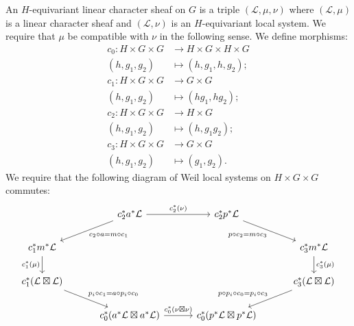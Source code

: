 \documentclass[10pt]{amsart}
\theoremstyle{plain}
\theoremstyle{definition}
\newcommand{\cs}[1]{{\mathcal{#1}}}
\begin{document}
An $H$-equivariant linear character sheaf on $G$ is a triple $(\cs{L},\mu, \nu)$ where $(\cs{L},\mu)$ is a linear character sheaf and $(\cs{L},\nu)$ is an $H$-equivariant local system.  We require that $\mu$ be compatible with $\nu$ in the following sense.
We define morphisms:
\begin{align*}
c_0 : H\times G \times G &\to H\times G \times H \times G \\
(h,g_1,g_2) &\mapsto (h,g_1,h,g_2); \\
c_1 : H \times G\times G &\to G\times G \\
(h, g_1, g_2) &\mapsto (hg_1,hg_2); \\
c_2 : H \times G\times G &\to H\times G \\
(h,g_1,g_2) &\mapsto (h, g_1g_2); \\
c_3 : H \times G\times G &\to G\times G \\
(h, g_1, g_2) &\mapsto (g_1, g_2).
\end{align*}
We require that the following diagram of Weil local systems on $H \times G\times G$ commutes:
\begin{equation}\label{ECS1}
\begin{tikzcd}[column sep=30]
\ & \arrow{dl}{c_2\circ a = m\circ c_1}  c_2^* a^* \cs{L} \arrow{r}{c_2^*(\nu)} & c_2^* p^* \cs{L} \arrow{dr}[swap]{p\circ c_2 = m\circ c_3}  &  \\
\arrow{d}[swap]{c_1^*(\mu)} c_1^* m^* \cs{L} &&& c_3^* m^*\cs{L} \arrow{d}{c_3^*(\mu)} \\
c_1^*(\cs{L}\boxtimes \cs{L}) \arrow{dr}{p_i\circ c_1 = a\circ p_i\circ c_0} &&& \arrow{dl}[swap]{p\circ p_i\circ c_0 = p_i \circ c_3} c_3^*(\cs{L}\boxtimes \cs{L}) \\
 & c_0^*(a^*\cs{L}\boxtimes a^*\cs{L}) \arrow{r}{c_0^*(\nu\boxtimes \nu)} & c_0^*(p^*\cs{L} \boxtimes p^*\cs{L}) & 
\end{tikzcd}
\end{equation}

\end{document}
